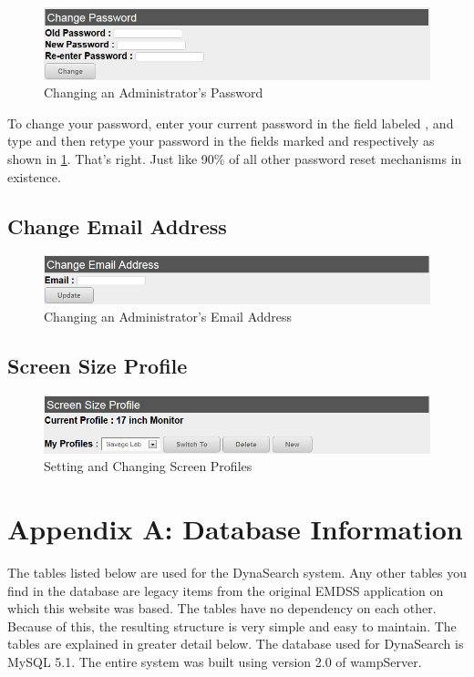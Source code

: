 \documentclass[article]{ij4uq}              %
\begin{document}
\begin{figure}[h!]
 \centering
 \includegraphics[width=5.0in]{figures/adminPassword.png}
 \caption{Changing an Administrator's Password}
 \label{fig:adminPassword}
\end{figure}
\FloatBarrier

To change your password, enter your current password in the field labeled , and type and then retype your password in the fields marked  and  respectively as shown in \ref{fig:adminPassword}.  That's right.  Just like 90\% of all other password reset mechanisms in existence. 

\subsection{Change Email Address}

\begin{figure}[h!]
 \centering
 \includegraphics[width=5.0in]{figures/adminEmail.png}
 \caption{Changing an Administrator's Email Address}
 \label{fig:adminEmail}
\end{figure}
\FloatBarrier

\subsection{Screen Size Profile}

\begin{figure}[h!]
 \centering
 \includegraphics[width=5.0in]{figures/adminScreenProf.png}
 \caption{Setting and Changing Screen Profiles}
 \label{fig:adminScreenProf}
\end{figure}
\FloatBarrier

\section{Appendix A: Database Information}
The tables listed below are used for the DynaSearch system. Any other tables you find in the database are legacy items from the original EMDSS application on which this website was based. The tables have no dependency on each other. Because of this, the resulting structure is very simple and easy to maintain. The tables are explained in greater detail below. The database used for DynaSearch is MySQL 5.1. The entire system was built using version 2.0 of wampServer.
\end{document}
